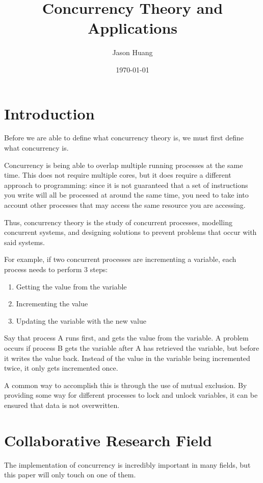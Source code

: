 \documentclass[jou]{apa7}
\title{Concurrency Theory and Applications}
\author{Jason Huang}
\date{\today}
\begin{document}
\maketitle

\section{Introduction}
Before we are able to define what concurrency theory is,
we must first define what concurrency is.

Concurrency is being able to overlap multiple running processes at the same time.
This does not require multiple cores,
but it does require a different approach to programming:
since it is not guaranteed that a set of instructions you write will all be processed at around the same time,
you need to take into account other processes that may access the same resource you are accessing.

Thus, concurrency theory is the study of concurrent processes,
modelling concurrent systems,
and designing solutions to prevent problems that occur with said systems.
\autocite{lamportTuringLectureComputer2015}
\autocite{lamport1978time}

For example, if two concurrent processes are incrementing a variable,
each process needs to perform 3 steps:

\begin{enumerate}
  \item Getting the value from the variable
  \item Incrementing the value
  \item Updating the variable with the new value
\end{enumerate}

Say that process A runs first, and gets the value from the variable.
A problem occurs if process B gets the variable after A has retrieved the variable, but before it writes the value back.
Instead of the value in the variable being incremented twice, it only gets incremented once.

A common way to accomplish this is through the use of mutual exclusion.
By providing some way for different processes to lock and unlock variables,
it can be ensured that data is not overwritten.

\section{Collaborative Research Field}
The implementation of concurrency is incredibly important in many fields,
but this paper will only touch on one of them.
\end{document}
